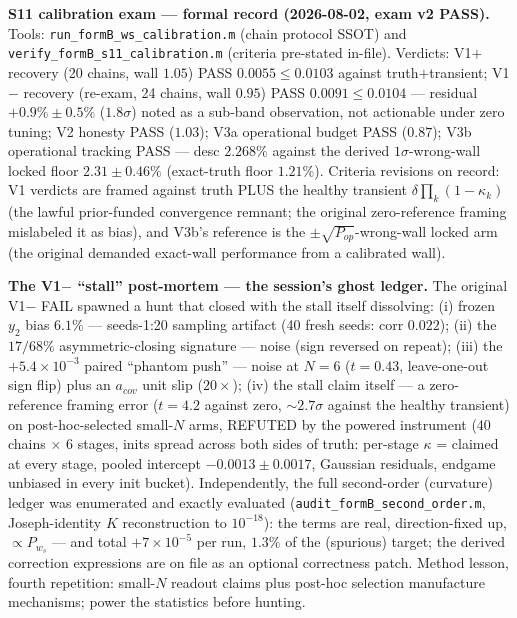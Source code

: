 \documentclass[11pt,a4paper,fontset=none]{ctexart}
\begin{document}
\textbf{S11 calibration exam --- formal record (2026-08-02, exam v2
PASS).}  Tools:\linebreak
\texttt{run\_formB\_ws\_calibration.m} (chain protocol
SSOT) and \texttt{verify\_formB\_s11\_calibration.m} (criteria
pre-stated in-file).  Verdicts: V1$+$ recovery (20 chains, wall $1.05$)
PASS $0.0055 \leq 0.0103$ against truth$+$transient; V1$-$ recovery
(re-exam, 24 chains, wall $0.95$) PASS $0.0091 \leq 0.0104$ ---
residual $+0.9\% \pm 0.5\%$ ($1.8\sigma$) noted as a sub-band
observation, not actionable under zero tuning; V2 honesty PASS ($1.03$);
V3a operational budget PASS ($0.87$); V3b operational tracking PASS ---
desc $2.268\%$ against the derived $1\sigma$-wrong-wall locked floor
$2.31 \pm 0.46\%$ (exact-truth floor $1.21\%$).  Criteria revisions on
record: V1 verdicts are framed against truth PLUS the healthy transient
$\delta\prod_k(1-\kappa_k)$ (the lawful prior-funded convergence
remnant; the original zero-reference framing mislabeled it as bias),
and V3b's reference is the $\pm\sqrt{P_{op}}$-wrong-wall locked arm
(the original demanded exact-wall performance from a calibrated wall).

\textbf{The V1$-$ ``stall'' post-mortem --- the session's ghost ledger.}
The original V1$-$ FAIL spawned a hunt that closed with the stall
itself dissolving: (i) frozen $y_2$ bias $6.1\%$ --- seeds-1:20
sampling artifact (40 fresh seeds: corr $0.022$); (ii) the $17/68\%$
asymmetric-closing signature --- noise (sign reversed on repeat);
(iii) the $+5.4\times10^{-3}$ paired ``phantom push'' --- noise at
$N{=}6$ ($t = 0.43$, leave-one-out sign flip) plus an $a_{cov}$ unit
slip ($20\times$); (iv) the stall claim itself --- a zero-reference
framing error ($t = 4.2$ against zero, $\sim 2.7\sigma$ against the
healthy transient) on post-hoc-selected small-$N$ arms, REFUTED by the
powered instrument (40 chains $\times$ 6 stages, inits spread across
both sides of truth: per-stage $\kappa$ = claimed at every stage,
pooled intercept $-0.0013 \pm 0.0017$, Gaussian residuals, endgame
unbiased in every init bucket).  Independently, the full second-order
(curvature) ledger was enumerated and exactly evaluated
(\texttt{audit\_formB\_second\_order.m}, Joseph-identity $K$
reconstruction to $10^{-18}$): the terms are real, direction-fixed up,
$\propto P_{w_s}$ --- and total $+7\times10^{-5}$ per run, $1.3\%$ of
the (spurious) target; the derived correction expressions are on file
as an optional correctness patch.  Method lesson, fourth repetition:
small-$N$ readout claims plus post-hoc selection manufacture
mechanisms; power the statistics before hunting.
\end{document}
